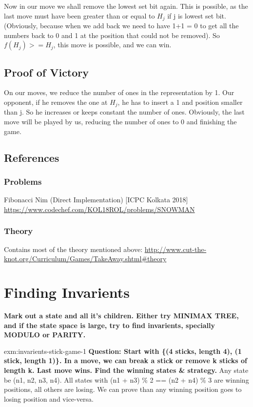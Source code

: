 Now in our move we shall remove the lowest set bit again. This is possible, as the last move must have been greater than or equal to $H_j$ if j is lowest set bit. (Obviously, because when we add back we need to have 1+1 = 0 to get all the numbers back to 0 and 1 at the position that could not be removed). So $f(H_j) >= H_j$, this move is possible, and we can win.

\subsection{Proof of Victory}
On our moves, we reduce the number of ones in the representation by 1. Our opponent, if he removes the one at $H_j$, he has to insert a 1 and position smaller than j. So he increases or keeps constant the number of ones. Obviously, the last move will be played by us, reducing the number of ones to 0 and finishing the game.


\subsection{References}

\subsubsection{Problems}
Fibonacci Nim (Direct Implementation) [ICPC Kolkata 2018] \url{https://www.codechef.com/KOL18ROL/problems/SNOWMAN}

\subsubsection{Theory}
Contains most of the theory mentioned above: \url{http://www.cut-the-knot.org/Curriculum/Games/TakeAway.shtml#theory}



\section{Finding Invarients}

\textbf{Mark out a state and all it's children. Either try MINIMAX TREE, and if the state space is large, try to find invarients, specially MODULO or PARITY.}

\begin{example}{exm:invarients-stick-game-1}
  \textbf{Question: Start with \{(4 sticks, length 4), (1 stick, length 1)\}. In a move, we can break a stick or remove k sticks of length k. Last move wins. Find the winning states \& strategy.}
  Any state be (n1, n2, n3, n4). All states with (n1 + n3) \% 2 == (n2 + n4) \% 3 are winning positions, all others are losing. We can prove than any winning position goes to losing position and vice-versa.
\end{example}
